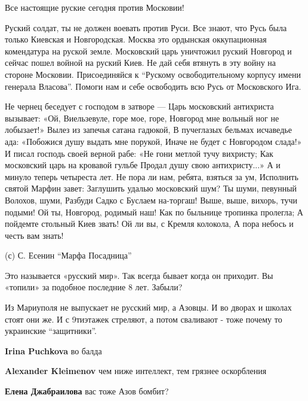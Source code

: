 \begin{itemize}
Все настоящие руские сегодня против Московии!

Руский солдат, ты не должен воевать против Руси. Все знают, что Русь была
только Киевская и Новгородская. Москва это ордынская оккупационная комендатура
на руской земле. Московский царь уничтожил руский Новгород и сейчас пошел
войной на руский Киев. Не дай себя втянуть в эту войну на стороне Московии.
Присоединяйся к \enquote{Рускому освободительному корпусу имени генерала
Власова}.  Помоги нам и себе освободить всю Русь от Московского Ига.

\raggedcolumns
\begin{multicols}{2} %
\setlength{\parindent}{0pt}
\obeycr
Не чернец беседует с господом в затворе —
Царь московский антихриста вызывает:
«Ой, Виельзевуле, горе мое, горе,
Новгород мне вольный ног не лобызает!»
\smallskip
Вылез из запечья сатана гадюкой,
В пучеглазых бельмах исчаведье ада:
«Побожися душу выдать мне порукой,
Иначе не будет с Новгородом слада!»
\smallskip
И писал господь своей верной рабе:
«Не гони метлой тучу вихристу;
Как московский царь на кровавой гульбе
Продал душу свою антихристу...»
\smallskip
А и минуло теперь четыреста лет.
Не пора ли нам, ребята, взяться за ум,
Исполнить святой Марфин завет:
Заглушить удалью московский шум?
\smallskip
Ты шуми, певунный Волохов, шуми,
Разбуди Садко с Буслаем на-торгаш!
Выше, выше, вихорь, тучи подыми!
Ой ты, Новгород, родимый наш!
\smallskip
Как по быльнице тропинка пролегла;
А пойдемте стольный Киев звать!
Ой ли вы, с Кремля колокола,
А пора небось и честь вам знать!
\restorecr
\end{multicols} %

(с) С. Есенин \enquote{Марфа Посадница}


Это называется «русский мир». Так всегда бывает когда он приходит. Вы «топили»
за подобное последние 8 лет. Забыли?

\begin{itemize} %

Из Мариуполя не выпускает не русский мир, а Азовцы. И во дворах и школах стоят
они же. И с 9тиэтажек стреляют, а потом сваливают - тоже почему то украинские
\enquote{защитники}.

\textbf{Irina Puchkova} во балда

\textbf{Alexander Kleimenov} чем ниже интеллект, тем грязнее оскорбления

\textbf{Елена Джабраилова} вас тоже Азов бомбит?


\end{itemize}
\end{itemize}
